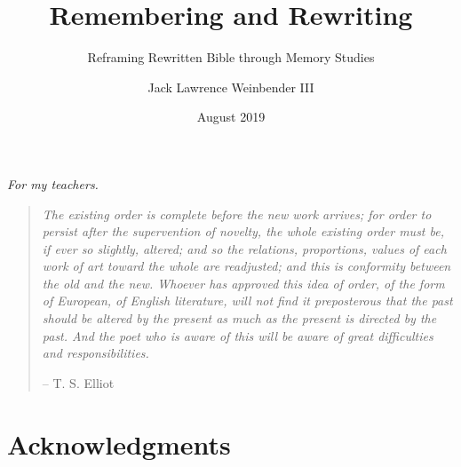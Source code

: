

\author{Jack Lawrence Weinbender III}
\date{August 2019}
\title{Remembering and Rewriting}
\subtitle{Reframing Rewritten Bible through Memory Studies}


\makecopyright


\makesignatures

\maketitle

\clearpage
\vspace*{3in}
\begin{center}
  {\large\itshape For my teachers.}
\end{center}

\clearpage
\vspace*{2in}
\begin{quote}
  \emph{The existing order is complete before the new work arrives; for order to persist after the supervention of novelty, the whole existing order must be, if ever so slightly, altered; and so the relations, proportions, values of each work of art toward the whole are readjusted; and this is conformity between the old and the new. Whoever has approved this idea of order, of the form of European, of English literature, will not find it preposterous that the past should be altered by the present as much as the present is directed by the past. And the poet who is aware of this will be aware of great difficulties and responsibilities.}

  \begin{center}
    -- T. S. Elliot
  \end{center}
\end{quote}

\clearpage
\chapter*{Acknowledgments}

